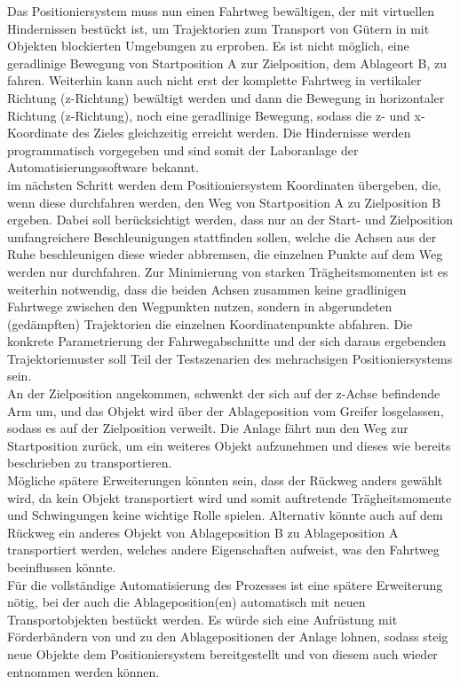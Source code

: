 \documentclass[../../../Bachelorarbeit.tex]{subfiles}
\begin{document}
Das Positioniersystem muss nun einen Fahrtweg bewältigen, der mit virtuellen Hindernissen bestückt ist, um Trajektorien zum Transport von Gütern in mit Objekten blockierten Umgebungen zu erproben. Es ist nicht möglich, eine geradlinige Bewegung von Startposition A zur Zielposition, dem Ablageort B, zu fahren. Weiterhin kann auch nicht erst der komplette Fahrtweg in vertikaler Richtung (z-Richtung) bewältigt werden und dann die Bewegung in horizontaler Richtung (z-Richtung), noch eine geradlinige Bewegung, sodass die z- und x-Koordinate des Zieles gleichzeitig erreicht werden. Die Hindernisse werden programmatisch vorgegeben und sind somit der Laboranlage \bzw der Automatisierungssoftware bekannt.\\
im nächsten Schritt werden dem Positioniersystem Koordinaten übergeben, die, wenn diese durchfahren werden, den Weg von Startposition A zu Zielposition B ergeben. Dabei soll berücksichtigt werden, dass nur an der Start- und Zielposition umfangreichere Beschleunigungen stattfinden sollen, welche die Achsen aus der Ruhe beschleunigen \bzw diese wieder abbremsen, die einzelnen Punkte auf dem Weg werden nur durchfahren. Zur Minimierung von starken Trägheitsmomenten ist es weiterhin notwendig, dass die beiden Achsen zusammen keine gradlinigen Fahrtwege zwischen den Wegpunkten nutzen, sondern in abgerundeten (gedämpften) Trajektorien die einzelnen Koordinatenpunkte abfahren. Die konkrete Parametrierung der Fahrwegabschnitte und der sich daraus ergebenden Trajektoriemuster soll Teil der Testszenarien des mehrachsigen Positioniersystems sein.\\
An der Zielposition angekommen, schwenkt der sich auf der z-Achse befindende Arm um, und das Objekt wird über der Ablageposition vom Greifer losgelassen, sodass es auf der Zielposition verweilt. Die Anlage fährt nun den Weg zur Startposition zurück, um ein weiteres Objekt aufzunehmen und dieses wie bereits beschrieben zu transportieren.\\
Mögliche spätere Erweiterungen könnten sein, dass der Rückweg anders gewählt wird, da kein Objekt transportiert wird und somit auftretende Trägheitsmomente und Schwingungen keine wichtige Rolle spielen. Alternativ könnte auch auf dem Rückweg ein anderes Objekt von Ablageposition B zu Ablageposition A transportiert werden, welches andere Eigenschaften aufweist, was den Fahrtweg beeinflussen könnte.\\
Für die vollständige Automatisierung des Prozesses ist eine spätere Erweiterung nötig, bei der auch die Ablageposition(en) automatisch mit neuen Transportobjekten bestückt werden. Es würde sich eine Aufrüstung mit Förderbändern von und zu den Ablagepositionen der Anlage lohnen, sodass steig neue Objekte dem Positioniersystem bereitgestellt und von diesem auch wieder entnommen werden können.\\
\end{document}
